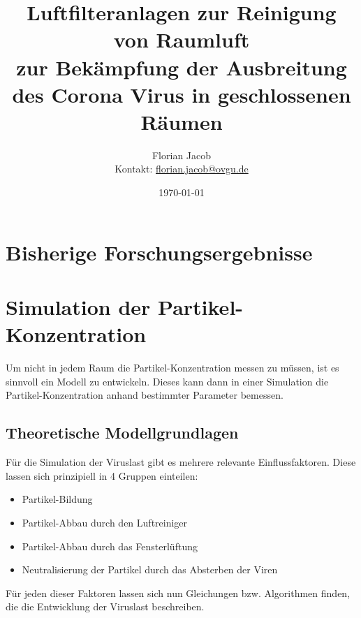 \documentclass[12pt,a4paper,bibtotocnumbered,liststotocnumbered]{scrreprt}
\title{\textbf{Luftfilteranlagen zur Reinigung von Raumluft}\\zur Bekämpfung der Ausbreitung des Corona Virus in geschlossenen Räumen}
\author{Florian Jacob \\Kontakt: \url{florian.jacob@ovgu.de}}
\date{\today}
\begin{document}
\maketitle
\tableofcontents
\newpage
{}
\plain



\chapter{Bisherige Forschungsergebnisse}

\chapter{Simulation der Partikel-Konzentration}
Um nicht in jedem Raum die Partikel-Konzentration messen zu müssen, ist es sinnvoll ein Modell zu entwickeln. Dieses kann dann in einer Simulation die Partikel-Konzentration anhand bestimmter Parameter bemessen.

\section{Theoretische Modellgrundlagen}
Für die Simulation der Viruslast gibt es mehrere relevante Einflussfaktoren. Diese lassen sich prinzipiell in 4 Gruppen einteilen:
\begin{itemize}
\item Partikel-Bildung
\item Partikel-Abbau durch den Luftreiniger
\item Partikel-Abbau durch das Fensterlüftung
\item Neutralisierung der Partikel durch das Absterben der Viren
\end{itemize}
Für jeden dieser Faktoren lassen sich nun Gleichungen bzw. Algorithmen finden, die die Entwicklung der Viruslast beschreiben.
\end{document}
